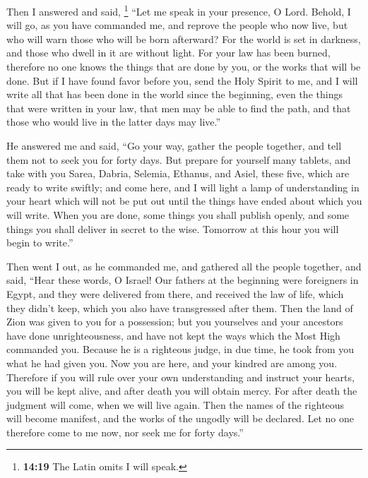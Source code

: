  Then I answered and said, \footnote{\textbf{14:19} The
  Latin omits I will speak.} ``Let me speak in your presence, O Lord.
 Behold, I will go, as you have commanded me, and reprove
the people who now live, but who will warn those who will be born
afterward? For the world is set in darkness, and those who dwell in it
are without light.  For your law has been burned,
therefore no one knows the things that are done by you, or the works
that will be done.  But if I have found favor before you,
send the Holy Spirit to me, and I will write all that has been done in
the world since the beginning, even the things that were written in your
law, that men may be able to find the path, and that those who would
live in the latter days may live.''

 He answered me and said, ``Go your way, gather the
people together, and tell them not to seek you for forty days.
 But prepare for yourself many tablets, and take with you
Sarea, Dabria, Selemia, Ethanus, and Asiel, these five, which are ready
to write swiftly;  and come here, and I will light a lamp
of understanding in your heart which will not be put out until the
things have ended about which you will write.  When you
are done, some things you shall publish openly, and some things you
shall deliver in secret to the wise. Tomorrow at this hour you will
begin to write.''

 Then went I out, as he commanded me, and gathered all
the people together, and said,  ``Hear these words, O
Israel!  Our fathers at the beginning were foreigners in
Egypt, and they were delivered from there,  and received
the law of life, which they didn't keep, which you also have
transgressed after them.  Then the land of Zion was given
to you for a possession; but you yourselves and your ancestors have done
unrighteousness, and have not kept the ways which the Most High
commanded you.  Because he is a righteous judge, in due
time, he took from you what he had given you.  Now you
are here, and your kindred are among you.  Therefore if
you will rule over your own understanding and instruct your hearts, you
will be kept alive, and after death you will obtain mercy.
 For after death the judgment will come, when we will
live again. Then the names of the righteous will become manifest, and
the works of the ungodly will be declared.  Let no one
therefore come to me now, nor seek me for forty days.''

